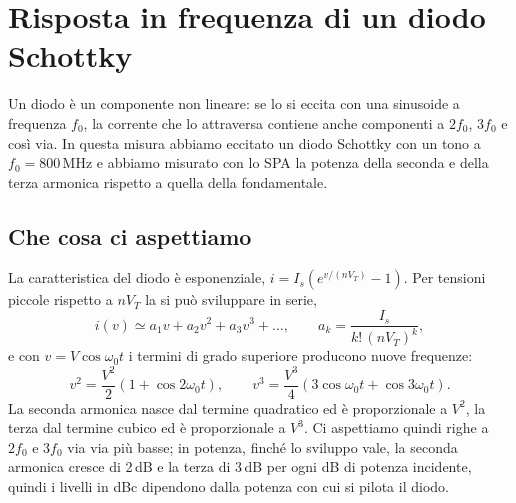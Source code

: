 \documentclass[11pt,a4paper,oneside]{book}
\begin{document}
\chapter{Risposta in frequenza di un diodo Schottky}
\label{cap:diodo}

Un diodo è un componente non lineare: se lo si eccita con una sinusoide a frequenza $f_0$, la corrente che lo attraversa contiene anche componenti a $2f_0$, $3f_0$ e così via. In questa misura abbiamo eccitato un diodo Schottky con un tono a $f_0 = 800$\,MHz e abbiamo misurato con lo SPA la potenza della seconda e della terza armonica rispetto a quella della fondamentale.

\section{Che cosa ci aspettiamo}
La caratteristica del diodo è esponenziale, $i = I_s\left(e^{v/(nV_T)} - 1\right)$. Per tensioni piccole rispetto a $nV_T$ la si può sviluppare in serie,
\begin{equation}
i(v) \simeq a_1 v + a_2 v^2 + a_3 v^3 + \dots, \qquad a_k = \frac{I_s}{k!\,(nV_T)^k},
\end{equation}
e con $v = V\cos\omega_0 t$ i termini di grado superiore producono nuove frequenze:
\begin{equation}
v^2 = \frac{V^2}{2}\left(1 + \cos 2\omega_0 t\right), \qquad
v^3 = \frac{V^3}{4}\left(3\cos\omega_0 t + \cos 3\omega_0 t\right).
\end{equation}
La seconda armonica nasce dal termine quadratico ed è proporzionale a $V^2$, la terza dal termine cubico ed è proporzionale a $V^3$. Ci aspettiamo quindi righe a $2f_0$ e $3f_0$ via via più basse; in potenza, finché lo sviluppo vale, la seconda armonica cresce di 2\,dB e la terza di 3\,dB per ogni dB di potenza incidente, quindi i livelli in dBc dipendono dalla potenza con cui si pilota il diodo.
\end{document}
